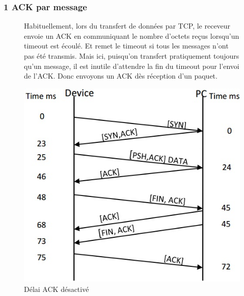 \begin{frame}
 \frametitle{1 ACK par message}
 \begin{figure}
  \begin{minipage}[c]{.46\linewidth}
 Habituellement, lors du transfert de données par TCP, le receveur envoie un ACK en communiquant le nombre d'octets reçus lorsqu'un timeout est écoulé. Et remet le timeout si tous les messages n'ont pas été transmis. Mais ici, puisqu'on transfert pratiquement toujours qu'un message, il est inutile d'attendre la fin du timeout pour l'envoi de l'ACK. Donc envoyons un ACK dès réception d'un paquet.
 \end{minipage}
 \begin{minipage}[c]{.46\linewidth}
  \includegraphics[scale=0.45]{figures/delayedACK.jpg}
  \caption{Délai ACK désactivé}
  \end{minipage}
 \end{figure}
\end{frame}
